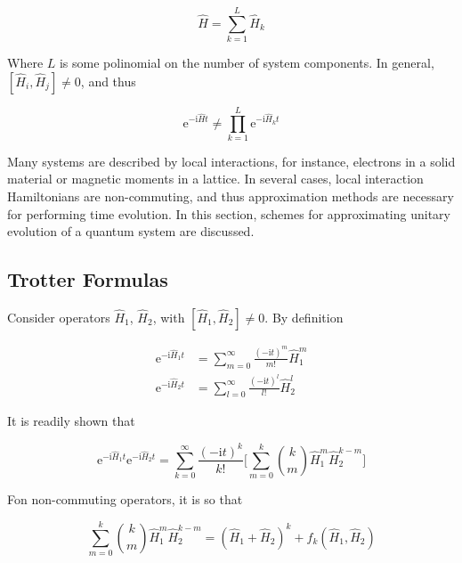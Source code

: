   \begin{equation}
    \hat{H} = \sum_{k = 1}^{L} \hat{H}_k
    \label{eq:SparseHam}
  \end{equation}

  Where $L$ is some polinomial on the number of system components. In general, $[\hat{H}_i,\hat{H}_j] \neq 0$, and thus

  \begin{equation}
    \mathrm{e}^{-\mathrm{i}\hat{H}t} \neq \prod_{k = 1}^{L} \mathrm{e}^{-\mathrm{i}\hat{H}_kt}
    \label{eq:CommuteUnit}
  \end{equation}

  Many systems are described by local interactions, for instance, electrons in a solid material or magnetic moments in a lattice. In several cases, local interaction Hamiltonians are non-commuting, and thus approximation methods are necessary for performing time evolution. In this section, schemes for approximating unitary evolution of a quantum system are discussed.

  \subsection{Trotter Formulas}

  Consider operators $\hat{H}_1$, $\hat{H}_2$, with $[\hat{H}_1,\hat{H}_2] \neq 0$. By definition

  \begin{align}
    \mathrm{e}^{-\mathrm{i}\hat{H}_1 t} & = \sum_{m = 0}^{\infty} \frac{(-\mathrm{i}t)^m}{m!}\hat{H}_1^m \\
    \mathrm{e}^{-\mathrm{i}\hat{H}_2 t} & = \sum_{l = 0}^{\infty} \frac{(-\mathrm{i}t)^l}{l!}\hat{H}_2^l
    \label{eq:ExpSeries}
  \end{align}

  It is readily shown that

  \begin{equation}
    \mathrm{e}^{-\mathrm{i}\hat{H}_1 t}\mathrm{e}^{-\mathrm{i}\hat{H}_2 t} = \sum_{k = 0}^{\infty} \frac{(-\mathrm{i}t)^k}{k!} \Bigg[\sum_{m = 0}^k \binom{k}{m} \hat{H}_1^m \hat{H}_2^{k-m}\Bigg]
    \label{eq:ExpProdExact}
  \end{equation}

  Fon non-commuting operators, it is so that

  \begin{equation}
    \sum_{m = 0}^k \binom{k}{m} \hat{H}_1^m \hat{H}_2^{k-m} = (\hat{H}_1 + \hat{H}_2)^k + f_k(\hat{H}_1,\hat{H}_2)
    \label{eq:BinomialTheorem}
  \end{equation}

